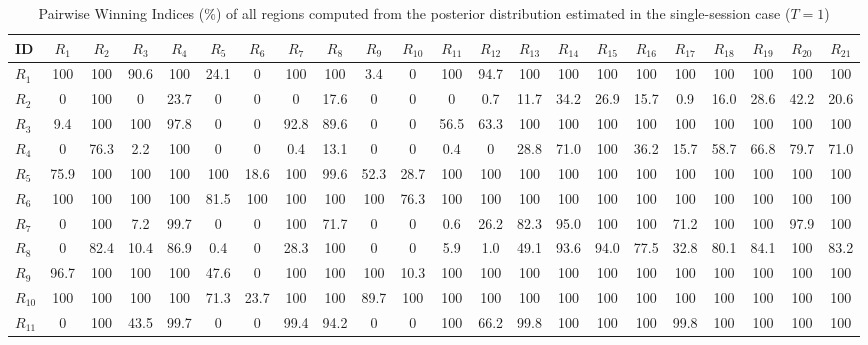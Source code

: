 \begin{table}[h!]
\centering
\footnotesize
\caption{Pairwise Winning Indices (\%) of all regions computed from the posterior distribution estimated in the single-session case ($T=1$)}
\label{tab:S2_pwi_t1}
\begin{tabularx}{\textwidth}{X|CCCCCCCCCCCCCCCCCCCCC}
\toprule
ID&$R_{1}$&$R_{2}$&$R_{3}$&$R_{4}$&$R_{5}$&$R_{6}$&$R_{7}$&$R_{8}$&$R_{9}$&$R_{10}$&$R_{11}$&$R_{12}$&$R_{13}$&$R_{14}$&$R_{15}$&$R_{16}$&$R_{17}$&$R_{18}$&$R_{19}$&$R_{20}$&$R_{21}$\\
\midrule
$R_{1}$ & 100 & 100 & 90.6 & 100 & 24.1 & 0 & 100 & 100 & 3.4 & 0 & 100 & 94.7 & 100 & 100 & 100 & 100 & 100 & 100 & 100 & 100 & 100 \\
$R_{2}$ & 0 & 100 & 0 & 23.7 & 0 & 0 & 0 & 17.6 & 0 & 0 & 0 & 0.7 & 11.7 & 34.2 & 26.9 & 15.7 & 0.9 & 16.0 & 28.6 & 42.2 & 20.6 \\
$R_{3}$ & 9.4 & 100 & 100 & 97.8 & 0 & 0 & 92.8 & 89.6 & 0 & 0 & 56.5 & 63.3 & 100 & 100 & 100 & 100 & 100 & 100 & 100 & 100 & 100 \\
$R_{4}$ & 0 & 76.3 & 2.2 & 100 & 0 & 0 & 0.4 & 13.1 & 0 & 0 & 0.4 & 0 & 28.8 & 71.0 & 100 & 36.2 & 15.7 & 58.7 & 66.8 & 79.7 & 71.0 \\
$R_{5}$ & 75.9 & 100 & 100 & 100 & 100 & 18.6 & 100 & 99.6 & 52.3 & 28.7 & 100 & 100 & 100 & 100 & 100 & 100 & 100 & 100 & 100 & 100 & 100 \\
$R_{6}$ & 100 & 100 & 100 & 100 & 81.5 & 100 & 100 & 100 & 100 & 76.3 & 100 & 100 & 100 & 100 & 100 & 100 & 100 & 100 & 100 & 100 & 100 \\
$R_{7}$ & 0 & 100 & 7.2 & 99.7 & 0 & 0 & 100 & 71.7 & 0 & 0 & 0.6 & 26.2 & 82.3 & 95.0 & 100 & 100 & 71.2 & 100 & 100 & 97.9 & 100 \\
$R_{8}$ & 0 & 82.4 & 10.4 & 86.9 & 0.4 & 0 & 28.3 & 100 & 0 & 0 & 5.9 & 1.0 & 49.1 & 93.6 & 94.0 & 77.5 & 32.8 & 80.1 & 84.1 & 100 & 83.2 \\
$R_{9}$ & 96.7 & 100 & 100 & 100 & 47.6 & 0 & 100 & 100 & 100 & 10.3 & 100 & 100 & 100 & 100 & 100 & 100 & 100 & 100 & 100 & 100 & 100 \\
$R_{10}$ & 100 & 100 & 100 & 100 & 71.3 & 23.7 & 100 & 100 & 89.7 & 100 & 100 & 100 & 100 & 100 & 100 & 100 & 100 & 100 & 100 & 100 & 100 \\
$R_{11}$ & 0 & 100 & 43.5 & 99.7 & 0 & 0 & 99.4 & 94.2 & 0 & 0 & 100 & 66.2 & 99.8 & 100 & 100 & 100 & 99.8 & 100 & 100 & 100 & 100 \\

\end{tabularx}
\end{table}
